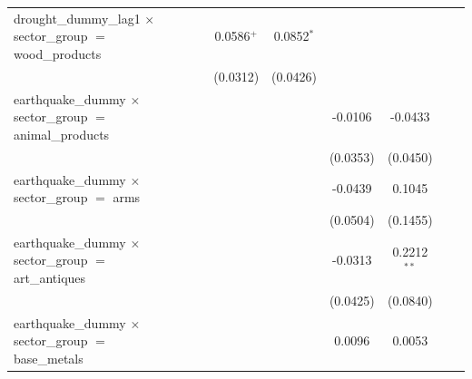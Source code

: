 \begin{tabular}{lcccccccc}
   drought\_dummy\_lag1 $\times$ sector\_group $=$ wood\_products                 &                       &                       & 0.0586$^{+}$          & 0.0852$^{*}$          &                       &                       &                       &   \\   
                                                                                  &                       &                       & (0.0312)              & (0.0426)              &                       &                       &                       &   \\   
   earthquake\_dummy $\times$ sector\_group $=$ animal\_products                  &                       &                       &                       &                       & -0.0106               & -0.0433               &                       &   \\   
                                                                                  &                       &                       &                       &                       & (0.0353)              & (0.0450)              &                       &   \\   
   earthquake\_dummy $\times$ sector\_group $=$ arms                              &                       &                       &                       &                       & -0.0439               & 0.1045                &                       &   \\   
                                                                                  &                       &                       &                       &                       & (0.0504)              & (0.1455)              &                       &   \\   
   earthquake\_dummy $\times$ sector\_group $=$ art\_antiques                     &                       &                       &                       &                       & -0.0313               & 0.2212$^{**}$         &                       &   \\   
                                                                                  &                       &                       &                       &                       & (0.0425)              & (0.0840)              &                       &   \\   
   earthquake\_dummy $\times$ sector\_group $=$ base\_metals                      &                       &                       &                       &                       & 0.0096                & 0.0053                &                       &   \\   

\end{tabular}
